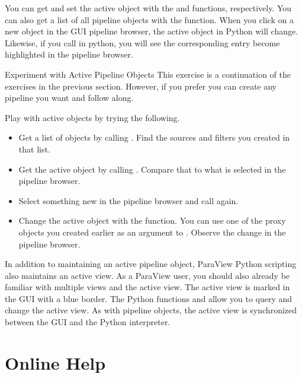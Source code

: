 You can get and set the active object with the  and
 functions, respectively.  You can also get a list
of all pipeline objects with the  function.  When you
click on a new object in the GUI pipeline browser, the active object in
Python will change.  Likewise, if you call  in
python, you will see the corresponding entry become highlighted in the
pipeline browser.

\begin{exercise}{Experiment with Active Pipeline Objects}
  \label{ex:ExperimentWithActivePipelineObjects}%
  This exercise is a continuation of the exercises in the previous
  section.  However, if you prefer you can create any pipeline you want and
  follow along.

  Play with active objects by trying the following.
  \begin{itemize}
  \item Get a list of objects by calling
    .  Find the sources and
    filters you created in that list.
  \item Get the active object by calling
    .  Compare that
    to what is selected in the pipeline browser.
  \item Select something new in the pipeline browser and call
     again.
  \item Change the active object with the 
    function. You can use one of the proxy objects you created earlier as
    an argument to . Observe the change in the
    pipeline browser.
  \end{itemize}
\end{exercise}

In addition to maintaining an active pipeline object, ParaView Python
scripting also maintains an active view.  As a ParaView user, you should
also already be familiar with multiple views and the active view.  The
active view is marked in the GUI with a blue border.  The Python functions
 and  allow you to query and
change the active view.  As with pipeline objects, the active view is
synchronized between the GUI and the Python interpreter.


\section{Online Help}
\label{sec:OnlineHelp}

